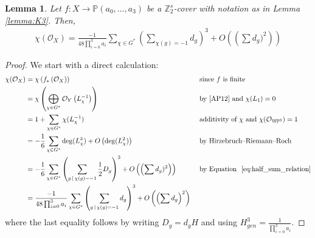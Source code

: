\documentclass[12pt,twoside,]{amsart}
\theoremstyle{plain}
\newtheorem{lemma}[theorem]{Lemma}
\theoremstyle{definition}
\begin{document}
\begin{lemma}
\label{lemma:holomorphic_euler_limit_chi_K3}
Let $f:X \to \mathbb{P}(a_0, \ldots, a_3)$ be a $\mathbb{Z}^s_2$-cover with notation as in Lemma \ref{lemma:K3}. Then, 
\begin{align*}
 \chi(\mathcal{O}_X) = 
\frac{-1}{48\prod_{i=0}^3 a_i}
\sum_{\chi \in G^*}
\left( \sum_{\chi(g)=-1} d_g \right)^3 
+ 
O\left( \left( 
\sum d_{g})^2
\right) \right)
\end{align*}
\end{lemma}
\begin{proof}
We start with a direct calculation:
\begin{align*}
 \chi(\mathcal{O}_X) &=
 \chi \left( 
 f_* \left( 
 \mathcal{O}_X
 \right) 
 \right)
&& \text{ since $f$ is finite}
 \\
 &=
\chi \left( 
 \bigoplus_{\chi \in G^*}
 \mathcal{O}_Y \left( L_{\chi}^{-1}\right)
 \right)
  && \text{ by 
  \cite[Eq (1)]{AP12} and $\chi(L_1) = 0$
  } 
 \\
&=
1 + \sum_{\chi \in G^*} \chi(L^{-1}_{\chi})
 && 
 \text{ 
additivity of  $\chi$ and $\chi(\mathcal{O}_{\mathbb{WP}^3}) = 1$
 }
\\
&=
- \frac{1}{6}\sum_{\chi \in G^*}\deg(L_{\chi}^3) + 
O \left( \deg(L_{\chi}^2) \right)
 && \text{ by Hirzebruch–Riemann–Roch}
\\
&=
- \frac{1}{6}\sum_{\chi \in G^*}
\left(
\sum_{g \, | \, \chi(g)=-1} 
\frac{1}{2}
D_g
\right)^3
+ 
O\left( \left( 
\sum d_{g})^2
\right) \right)
 && \text{ by Equation ~\eqref{eq:half_sum_relation}}
\\
&=
\frac{-1}{48 \prod_{i=0}^3a_i}\sum_{\chi \in G^*}
\left(
\sum_{g \, | \, \chi(g)= -1} d_g
\right)^3
+ 
O\left( \left( 
\sum d_{g}
\right)^2 \right)
 && 
\end{align*}
where the last equality follows 
by writing $D_g = d_g H$ and using
 $H_{gen}^3
 = 
 \frac{1}{\prod_{i=0}^3a_i}.
 $
\end{proof}

\end{document}
